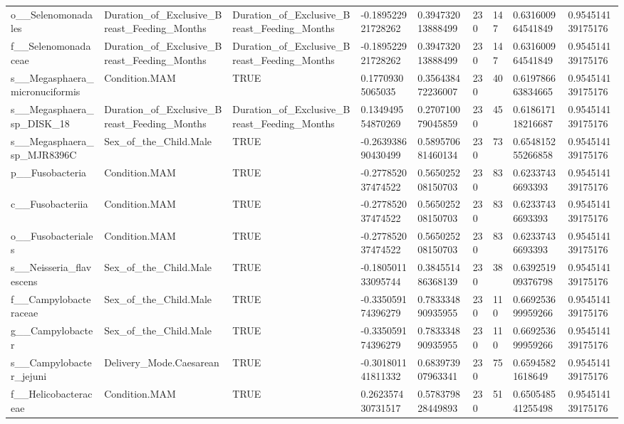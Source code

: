 \begin{longtable}{lllllllll}
o\_\_Selenomonadales & Duration\_of\_Exclusive\_Breast\_Feeding\_Months & Duration\_of\_Exclusive\_Breast\_Feeding\_Months & -0.189522921728262 & 0.394732013888499 & 230 & 147 & 0.631600964541849 & 0.954514139175176 \\
f\_\_Selenomonadaceae & Duration\_of\_Exclusive\_Breast\_Feeding\_Months & Duration\_of\_Exclusive\_Breast\_Feeding\_Months & -0.189522921728262 & 0.394732013888499 & 230 & 147 & 0.631600964541849 & 0.954514139175176 \\
s\_\_Megasphaera\_micronuciformis & Condition.MAM & TRUE & 0.17709305065035 & 0.356438472236007 & 230 & 40 & 0.619786663834665 & 0.954514139175176 \\
s\_\_Megasphaera\_sp\_DISK\_18 & Duration\_of\_Exclusive\_Breast\_Feeding\_Months & Duration\_of\_Exclusive\_Breast\_Feeding\_Months & 0.134949554870269 & 0.270710079045859 & 230 & 45 & 0.618617118216687 & 0.954514139175176 \\
s\_\_Megasphaera\_sp\_MJR8396C & Sex\_of\_the\_Child.Male & TRUE & -0.263938690430499 & 0.589570681460134 & 230 & 73 & 0.654815255266858 & 0.954514139175176 \\
p\_\_Fusobacteria & Condition.MAM & TRUE & -0.277852037474522 & 0.565025208150703 & 230 & 83 & 0.62337436693393 & 0.954514139175176 \\
c\_\_Fusobacteriia & Condition.MAM & TRUE & -0.277852037474522 & 0.565025208150703 & 230 & 83 & 0.62337436693393 & 0.954514139175176 \\
o\_\_Fusobacteriales & Condition.MAM & TRUE & -0.277852037474522 & 0.565025208150703 & 230 & 83 & 0.62337436693393 & 0.954514139175176 \\
s\_\_Neisseria\_flavescens & Sex\_of\_the\_Child.Male & TRUE & -0.180501133095744 & 0.384551486368139 & 230 & 38 & 0.639251909376798 & 0.954514139175176 \\
f\_\_Campylobacteraceae & Sex\_of\_the\_Child.Male & TRUE & -0.335059174396279 & 0.783334890935955 & 230 & 110 & 0.669253699959266 & 0.954514139175176 \\
g\_\_Campylobacter & Sex\_of\_the\_Child.Male & TRUE & -0.335059174396279 & 0.783334890935955 & 230 & 110 & 0.669253699959266 & 0.954514139175176 \\
s\_\_Campylobacter\_jejuni & Delivery\_Mode.Caesarean & TRUE & -0.301801141811332 & 0.683973907963341 & 230 & 75 & 0.65945821618649 & 0.954514139175176 \\
f\_\_Helicobacteraceae & Condition.MAM & TRUE & 0.262357430731517 & 0.578379828449893 & 230 & 51 & 0.650548541255498 & 0.954514139175176 \\

\end{longtable}
